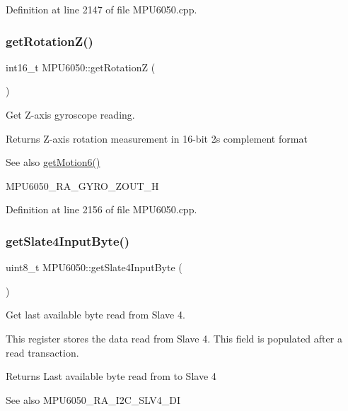 Definition at line 2147 of file M\+P\+U6050.\+cpp.

\mbox{\label{classMPU6050_ae0fee1ba996a2b6f914df6fc34e7da48}} 
\subsubsection{\texorpdfstring{getRotationZ()}{getRotationZ()}}
{\footnotesize\ttfamily int16\+\_\+t M\+P\+U6050\+::get\+RotationZ (\begin{DoxyParamCaption}{ }\end{DoxyParamCaption})}



Get Z-\/axis gyroscope reading. 

\begin{DoxyReturn}{Returns}
Z-\/axis rotation measurement in 16-\/bit 2\textquotesingle{}s complement format 
\end{DoxyReturn}
\begin{DoxySeeAlso}{See also}
\mbox{\hyperlink{classMPU6050_a574d3093dc131e4251a9b37adf208ca7}{get\+Motion6()}} 

M\+P\+U6050\+\_\+\+R\+A\+\_\+\+G\+Y\+R\+O\+\_\+\+Z\+O\+U\+T\+\_\+H 
\end{DoxySeeAlso}


Definition at line 2156 of file M\+P\+U6050.\+cpp.

\mbox{\label{classMPU6050_a9bc93f34bc3d85cbe6010b4a3a88c5a7}} 
\subsubsection{\texorpdfstring{getSlate4InputByte()}{getSlate4InputByte()}}
{\footnotesize\ttfamily uint8\+\_\+t M\+P\+U6050\+::get\+Slate4\+Input\+Byte (\begin{DoxyParamCaption}{ }\end{DoxyParamCaption})}



Get last available byte read from Slave 4. 

This register stores the data read from Slave 4. This field is populated after a read transaction. \begin{DoxyReturn}{Returns}
Last available byte read from to Slave 4 
\end{DoxyReturn}
\begin{DoxySeeAlso}{See also}
M\+P\+U6050\+\_\+\+R\+A\+\_\+\+I2\+C\+\_\+\+S\+L\+V4\+\_\+\+DI 
\end{DoxySeeAlso}


